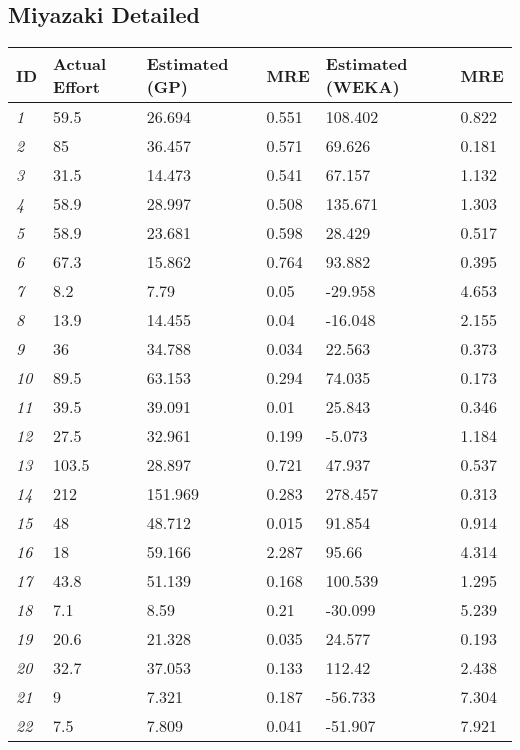\documentclass[miyazaki.tex]{subfiles}
\begin{document}
\subsection{Miyazaki Detailed} %
\label{sub:miyazaki_detailed}
	\begin{tabularx}{\textwidth}{| X | X || X | X || X | X |}
	\hline
	\textbf{ID} & \textbf{Actual \newline Effort} & \textbf{Estimated (GP)} &
	\textbf{MRE} & \textbf{Estimated (WEKA)} & \textbf{MRE} \\	\hline
	\hline
	\emph{1} & 59.5 & 26.694 & 0.551 & 108.402 & 0.822 \\
	\emph{2} & 85 & 36.457 & 0.571 & 69.626 & 0.181 \\
	\emph{3} & 31.5 & 14.473 & 0.541 & 67.157 & 1.132 \\
	\emph{4} & 58.9 & 28.997 & 0.508 & 135.671 & 1.303 \\
	\emph{5} & 58.9 & 23.681 & 0.598 & 28.429 & 0.517 \\
	\emph{6} & 67.3 & 15.862 & 0.764 & 93.882 & 0.395 \\
	\emph{7} & 8.2 & 7.79 & 0.05 & -29.958 & 4.653 \\
	\emph{8} & 13.9 & 14.455 & 0.04 & -16.048 & 2.155 \\
	\emph{9} & 36 & 34.788 & 0.034 & 22.563 & 0.373 \\
	\emph{10} & 89.5 & 63.153 & 0.294 & 74.035 & 0.173 \\
	\emph{11} & 39.5 & 39.091 & 0.01 & 25.843 & 0.346 \\
	\emph{12} & 27.5 & 32.961 & 0.199 & -5.073 & 1.184 \\
	\emph{13} & 103.5 & 28.897 & 0.721 & 47.937 & 0.537 \\
	\emph{14} & 212 & 151.969 & 0.283 & 278.457 & 0.313 \\
	\emph{15} & 48 & 48.712 & 0.015 & 91.854 & 0.914 \\
	\emph{16} & 18 & 59.166 & 2.287 & 95.66 & 4.314 \\
	\emph{17} & 43.8 & 51.139 & 0.168 & 100.539 & 1.295 \\
	\emph{18} & 7.1 & 8.59 & 0.21 & -30.099 & 5.239 \\
	\emph{19} & 20.6 & 21.328 & 0.035 & 24.577 & 0.193 \\
	\emph{20} & 32.7 & 37.053 & 0.133 & 112.42 & 2.438 \\
	\emph{21} & 9 & 7.321 & 0.187 & -56.733 & 7.304 \\
	\emph{22} & 7.5 & 7.809 & 0.041 & -51.907 & 7.921 \\

\end{tabularx}
\end{document}
